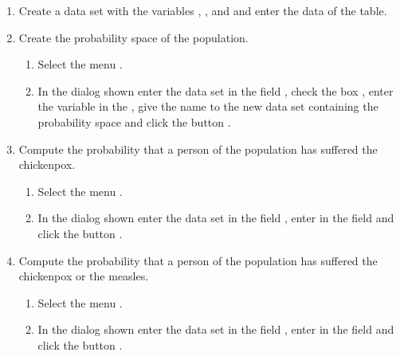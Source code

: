 \begin{enumerate}[leftmargin=*]
\begin{enumerate}
\item Create a data set  with the variables , ,
 and  and enter the data of the table. 

\item Create the probability space of the population.
\begin{indication}
\begin{enumerate}
\item Select the menu .
\item In the dialog shown enter the data set  in the field , check the box , enter the variable  in the , give the name
 to the new data set containing the probability space and click the button .
\end{enumerate}
\end{indication}  

\item Compute the probability that a person of the population has suffered the chickenpox. 
\begin{indication}
\begin{enumerate}
\item Select the menu .
\item In the dialog shown enter the data set  in the field , enter  in the field  and click the button .
\end{enumerate}
\end{indication} 

\item Compute the probability that a person of the population has suffered the chickenpox or the measles. 
\begin{indication}
\begin{enumerate}
\item Select the menu .
\item In the dialog shown enter the data set  in the field , enter
 in the field  and click the button .
\end{enumerate}
\end{indication} 


\end{enumerate}
\end{enumerate}
